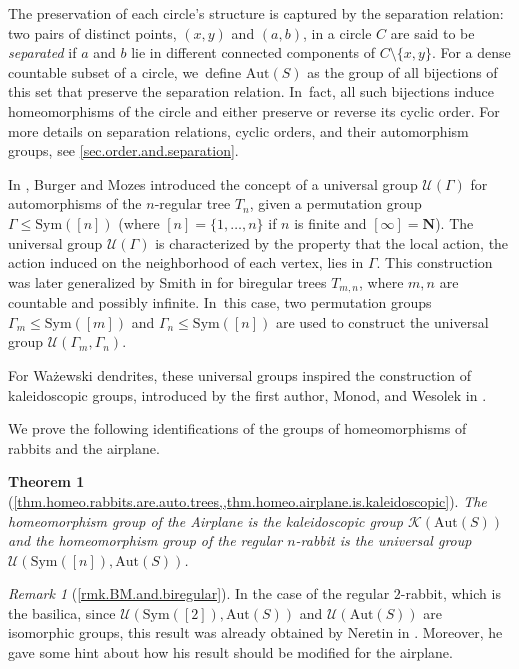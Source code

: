 \documentclass[JEP,XML,SOM,Unicode,NoFloatCountersInSection,published]{cedram}
\theoremstyle{plain}
\newtheorem{introtheorem}{Theorem}
\theoremstyle{definition}
\theoremstyle{remark}
\newtheorem{introremark}{Remark}
\newcommand{\Aut}{\mathrm{Aut}}
\newcommand{\Sym}{\mathrm{Sym}}
\newcommand{\U}{\mathcal{U}}
\newcommand{\K}{\mathcal{K}}
\begin{document}
The preservation of each circle's structure is captured by the separation relation:
two pairs of distinct points, \((x, y)\) and \((a, b)\), in a circle \(C\) are said to be \emph{separated} if \(a\) and \(b\) lie in different connected components of \(C \setminus \{x, y\}\).
For a dense countable subset of a circle, we~define \(\Aut(S)\) as the group of all bijections of this set that preserve the separation relation. In~fact, all such bijections induce homeomorphisms of the circle and either preserve or reverse its cyclic order.
For more details on separation relations, cyclic orders, and their automorphism groups, see \cref{sec.order.and.separation}.

In \cite{BM00}, Burger and Mozes introduced the concept of a universal group \(\U(\Gamma)\) for automorphisms of the \(n\)-regular tree \(T_n\), given a permutation group \(\Gamma \leq \Sym([n])\) (where \([n] = \{1, \dots, n\}\) if $n$ is finite and $[\infty]=\mathbf{N}$).
The universal group \(\U(\Gamma)\) is characterized by the property that the local action, \ie the action induced on the neighborhood of each vertex, lies in \(\Gamma\).
This construction was later generalized by Smith in \cite{biregular} for biregular trees \(T_{m, n}\), where \(m, n\) are countable and possibly infinite. In~this case, two permutation groups \(\Gamma_m \leq \Sym([m])\) and \(\Gamma_n \leq \Sym([n])\) are used to construct the universal group \(\U(\Gamma_m, \Gamma_n)\).

For Ważewski dendrites, these universal groups inspired the construction of kaleidoscopic groups, introduced by the first author, Monod, and Wesolek in \cite{Kaleidoscopic}.

We prove the following identifications of the groups of homeomorphisms of rabbits and the airplane.

\begin{introtheorem}[\cref{thm.homeo.rabbits.are.auto.trees,,thm.homeo.airplane.is.kaleidoscopic}]
\label{thm.identification}
The homeomorphism group of the Airplane is the kaleidoscopic group $\K(\Aut(S))$ and the homeomorphism group of the regular $n$-rabbit is the universal group $\U(\Sym([n]),\Aut(S))$.
\end{introtheorem}

\begin{introremark}[\cref{rmk.BM.and.biregular}]
In the case of the regular $2$-rabbit, which is the basilica, since $\U(\Sym([2]),\Aut(S))$ and $\U(\Aut(S))$ are isomorphic groups, this result was already obtained by Neretin in \cite{Neretin}.
Moreover, he gave some hint about how his result should be modified for the airplane.
\end{introremark}
\end{document}

